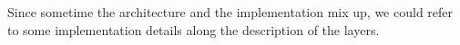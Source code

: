 Since sometime the architecture and the implementation mix up, we could refer to
some implementation details along the description of the layers.











